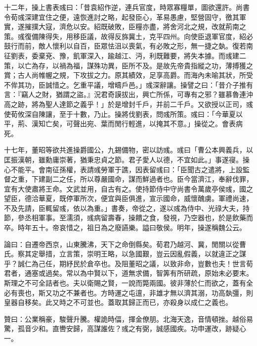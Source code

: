 \begin{pinyinscope}
十二年，操上書表彧曰：「昔袁紹作逆，連兵官度，時眾寡糧單，圖欲還許。尚書令荀彧深建宜住之便，遠恢進討之略，起發臣心，革易愚慮，堅營固守，徼其軍實，遂摧撲大寇，濟危以安。紹既破敗，臣糧亦盡，將舍河北之規，改就荊南之策。彧復備陳得失，用移臣議，故得反旆冀土，克平四州。向使臣退軍官度，紹必鼓行而前，敵人懷利以自百，臣眾怯沮以喪氣，有必敗之形，無一捷之埶。復若南征劉表，委棄兗、豫，飢軍深入，踰越江、沔，利既難要，將失本據。而彧建二策，以亡為存，以禍為福，謀殊功異，臣所不及。是故先帝貴指縱之功，薄搏獲之賞；古人尚帷幄之規，下攻拔之力。原其績效，足享高爵。而海內未喻其狀，所受不侔其功，臣誠惜之。乞重平議，增疇戶邑。」彧深辭讓。操譬之曰：「昔介子推有言：『竊人之財，猶謂之盜。』況君奇謨拔出，興亡所係，可專有之邪？雖慕魯連沖高之跡，將為聖人達節之義乎！」於是增封千戶，并前二千戶。又欲授以正司，彧使荀攸深自陳讓，至于十數，乃止。操將伐劉表，問彧所策。彧曰：「今華夏以平，荊、漢知亡矣，可聲出宛、葉而閒行輕進，以掩其不意。」操從之。會表病死。

十七年，董昭等欲共進操爵國公，九錫備物，密以訪彧。彧曰「曹公本興義兵，以匡振漢朝，雖勳庸崇著，猶秉忠貞之節。君子愛人以德，不宜如此。」事遂寑。操心不能平。會南征孫權，表請彧勞軍于譙，因表留彧曰：「臣聞古之遣將，上設監督之重，下建副二之任，所以尊嚴國命，謀而鮮過者也。臣今當濟江，奉辭伐罪，宜有大使肅將王命。文武並用，自古有之。使持節侍中守尚書令萬歲亭侯彧，國之望臣，德洽華夏，既停軍所次，便宜與臣俱進，宣示國命，威懷醜虜。軍禮尚速，不及先請，臣輒留彧，依以為重。」書奏，帝從之，遂以彧為侍中、光祿大夫，持節，參丞相軍事。至濡須，彧病留壽春，操饋之食，發視，乃空器也，於是飲藥而卒。時年五十。帝哀惜之，祖日為之廢讌樂。謚曰敬侯。明年，操遂稱魏公云。

論曰：自遷帝西京，山東騰沸，天下之命倒縣矣。荀君乃越河、冀，閒關以從曹氏。察其定舉措，立言策，崇明王略，以急國艱，豈云因亂假義，以就違正之謀乎？誠仁為己任，期紓民於倉卒也。及阻董昭之議，以致非命，豈數也夫！世言荀君者，通塞或過矣。常以為中賢以下，道無求備，智筭有所研疏，原始未必要末。斯理之不可全詰者也。夫以衛賜之賢，一說而斃兩國。彼非薄於仁而欲之，蓋有全必有喪也，斯又功之不兼者也。方時運之屯邅，非雄才無以濟其溺，功高埶彊，則皇器自移矣。此又時之不可並也。蓋取其歸正而已，亦殺身以成仁之義也。

贊曰：公業稱豪，駿聲升騰。權詭時偪，揮金僚朋。北海天逸，音情頓挫。越俗易驚，孤音少和。直轡安歸，高謀誰佐？彧之有弼，誠感國疾。功申運改，跡疑心一。


\end{pinyinscope}